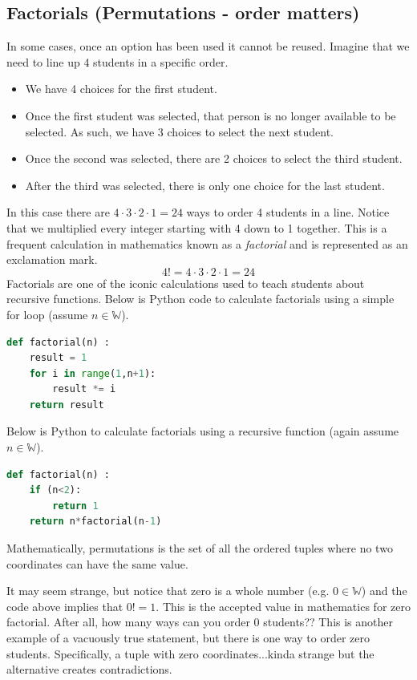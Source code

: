 \subsection*{Factorials (Permutations - order matters)}
In some cases, once an option has been used it cannot be reused.  Imagine that we need to line up 4 students in a specific order.  
\begin{itemize}
    \item We have 4 choices for the first student.
    \item Once the first student was selected, that person is no longer available to be selected.  As such, we have 3 choices to select the next student.
    \item Once the second was selected, there are 2 choices to select the third student.
    \item After the third was selected, there is only one choice for the last student.
\end{itemize}
In this case there are $4 \cdot 3 \cdot 2 \cdot 1 = 24$ ways to order 4 students in a line.   Notice that we multiplied every integer starting with 4 down to 1 together.  This is a frequent calculation in mathematics known as a \emph{factorial} and is represented as an exclamation mark. $$4! = 4 \cdot 3 \cdot 2 \cdot 1 = 24$$
Factorials are one of the iconic calculations used to teach students about recursive functions.  Below is Python code to calculate factorials using a simple for loop (assume $n\in \mathbb{W}$).
\begin{lstlisting}[language=Python]
def factorial(n) :
    result = 1
    for i in range(1,n+1): 
        result *= i        
    return result
\end{lstlisting}
Below is Python to calculate factorials using a recursive function (again assume $n \in \mathbb{W}$).

\begin{lstlisting}[language=Python]
def factorial(n) :
    if (n<2):
        return 1
    return n*factorial(n-1)
\end{lstlisting}

Mathematically, permutations is the set of all the ordered tuples where no two coordinates can have the same value.

It may seem strange, but notice that zero is a whole number (e.g. $0 \in \mathbb{W}$) and the code above implies that $0! = 1$.  This is the accepted value in mathematics for zero factorial.  After all, how many ways can you order 0 students?? This is another example of a vacuously true statement, but there is one way to order zero students. Specifically, a tuple with zero coordinates...kinda strange but the alternative creates contradictions.\\\\

